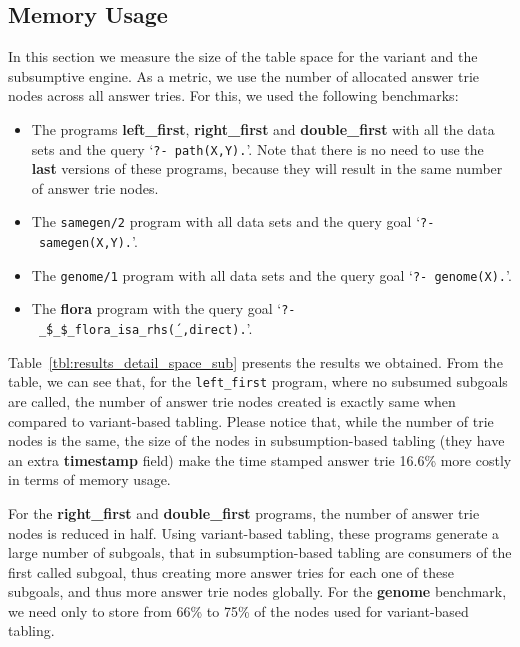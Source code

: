


\subsection{Memory Usage}

In this section we measure the size of the table space for the variant and the subsumptive engine.
As a metric, we use the number of allocated answer trie nodes across all answer tries.
For this, we used the following benchmarks:

\begin{itemize}
   \item The programs \textbf{left\_first}, \textbf{right\_first} and \textbf{double\_first} with
   all the data sets and the query `\texttt{?-~path(X,Y).}'. Note that there is no need to use
   the \textbf{last} versions of these programs, because they will result in the same number of answer trie nodes.
   
   \item The \texttt{samegen/2} program with all data sets and the query goal `\texttt{?-~samegen(X,Y).}'.
   
   \item The \texttt{genome/1} program with all data sets and the query goal `\texttt{?-~genome(X).}'.
   
   \item The \textbf{flora} program with the query goal `\texttt{?-~\'\_\$\_\$\_flora\_isa\_rhs\'(\_,direct).}'.
\end{itemize}

Table~\ref{tbl:results_detail_space_sub} presents the results we obtained. From the table, we can see that,
for the \texttt{left\_first} program, where no subsumed subgoals are called, the number of answer trie nodes created is
exactly same when compared to variant-based tabling. Please notice that, while the number of trie nodes is
the same, the size of the nodes in subsumption-based tabling (they have an extra \textbf{timestamp} field) make
the time stamped answer trie 16.6\% more costly in terms of memory usage.

For the \textbf{right\_first} and \textbf{double\_first} programs, the number of answer trie nodes
is reduced in half. Using variant-based tabling, these programs generate a large number of subgoals,
that in subsumption-based tabling are consumers of the first called subgoal, thus creating more
answer tries for each one of these subgoals, and thus more answer trie nodes globally.
For the \textbf{genome} benchmark, we need only to store from 66\% to 75\% of the nodes used for
variant-based tabling.

